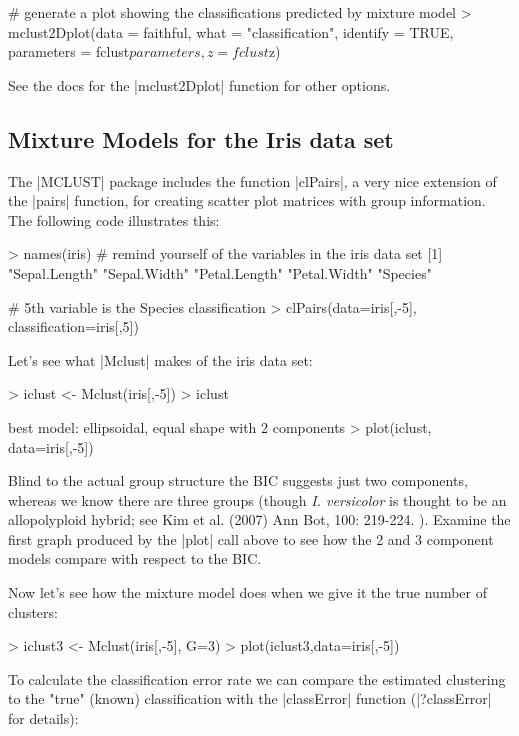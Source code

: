 \begin{Code}
# generate a plot showing the classifications predicted by mixture model    
> mclust2Dplot(data = faithful, what = "classification", identify = TRUE, 
    parameters = fclust$parameters, z = fclust$z)    
\end{Code}

See the docs for the |mclust2Dplot| function for other options.

\subsection*{Mixture Models for the Iris data set}

The |MCLUST| package includes the function |clPairs|, a very nice extension of the |pairs| function, for creating scatter plot matrices with group information. The following code illustrates this:

\begin{Code}
> names(iris) # remind yourself of the variables in the iris data set
[1] "Sepal.Length" "Sepal.Width"  "Petal.Length" "Petal.Width"  "Species"    

# 5th variable is the Species classification
> clPairs(data=iris[,-5], classification=iris[,5]) 
\end{Code}

Let's see what |Mclust| makes of the iris data set:

\begin{Code}
> iclust <- Mclust(iris[,-5])
> iclust

 best model: ellipsoidal, equal shape with 2 components
> plot(iclust, data=iris[,-5])    
\end{Code}

Blind to the actual group structure the BIC suggests just two components, whereas we know there are three groups (though \textit{I. versicolor} is thought to be an allopolyploid hybrid; see Kim et al. (2007) Ann Bot, 100: 219-224. ). Examine the first graph produced by the |plot| call above to see how the 2 and 3 component models compare with respect to the BIC.

Now let's see how the mixture model does when we give it the true number of clusters:

\begin{Code}
> iclust3 <- Mclust(iris[,-5], G=3)
> plot(iclust3,data=iris[,-5])    
\end{Code}

To calculate the classification error rate we can compare the estimated clustering to the "true" (known) classification with the |classError| function (|?classError| for details):


